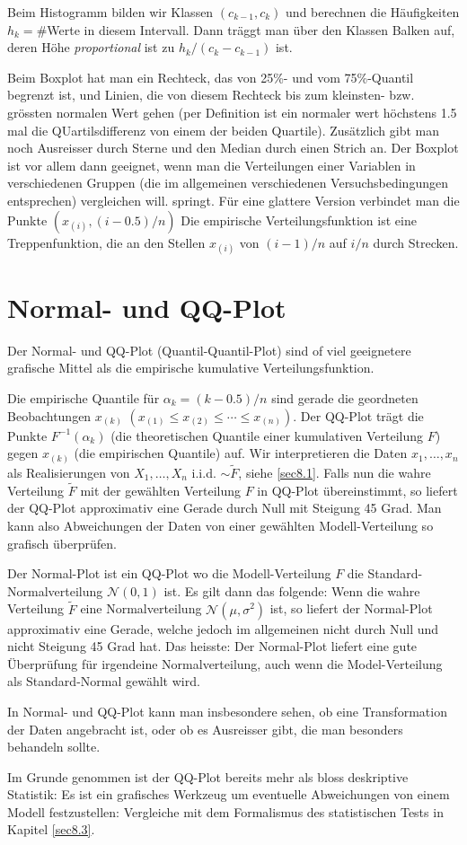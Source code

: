 Beim Histogramm bilden wir Klassen $(c_{k-1},c_k)$ und berechnen die Häufigkeiten $h_k=$\#Werte in diesem Intervall. Dann träggt man über den Klassen Balken auf, deren Höhe \emph{proportional} ist zu $h_k/(c_k-c_{k-1})$ ist.

Beim Boxplot hat man ein Rechteck, das von 25\%- und vom 75\%-Quantil begrenzt ist, und Linien, die von diesem Rechteck bis zum kleinsten- bzw. grössten \glqq normalen \grqq Wert gehen (per Definition ist ein normaler wert höchstens 1.5 mal die QUartilsdifferenz von einem der beiden Quartile). Zusätzlich gibt man noch Ausreisser durch Sterne und den Median durch einen Strich an. Der Boxplot ist vor allem dann geeignet, wenn man die Verteilungen einer Variablen in verschiedenen Gruppen (die im allgemeinen verschiedenen Versuchsbedingungen entsprechen) vergleichen will.
springt. Für eine glattere Version verbindet man die Punkte $(x_{(i)},(i-0.5)/n)$
Die empirische Verteilungsfunktion ist eine Treppenfunktion, die an den Stellen $x_{(i)}$ von $(i-1)/n$ auf $i/n$ durch Strecken.
\section{Normal- und QQ-Plot}
\label{sec7.3}
Der Normal- und QQ-Plot (\glqq Quantil-Quantil-Plot\grqq) sind of viel geeignetere grafische Mittel als die empirische kumulative Verteilungsfunktion.

Die empirische Quantile für $\alpha_k=(k-0.5)/n$ sind gerade die geordneten Beobachtungen $x_{(k)}$ $(x_{(1)}\leq x_{(2)}\leq \cdots \leq x_{(n)})$. Der QQ-Plot trägt die Punkte $F^{-1}(\alpha_k)$ (die theoretischen Quantile einer kumulativen Verteilung $F$) gegen $x_{(k)}$ (die empirischen Quantile) auf. Wir interpretieren die Daten $x_1,\ldots,x_n$ als Realisierungen von $X_1,\ldots,X_n$ i.i.d. $\sim \tilde{F}$, siehe \ref{sec8.1}. Falls nun die wahre Verteilung $\tilde{F}$ mit der gewählten Verteilung $F$ in QQ-Plot übereinstimmt, so liefert der QQ-Plot approximativ eine Gerade durch Null mit Steigung 45 Grad. Man kann also Abweichungen der Daten von einer gewählten Modell-Verteilung so grafisch überprüfen.

Der Normal-Plot ist ein QQ-Plot wo die Modell-Verteilung $F$ die Standard-Normalverteilung $\mathcal{N}(0,1)$ ist. Es gilt dann das folgende: Wenn die wahre Verteilung $\tilde{F}$ eine Normalverteilung $\mathcal{N}(\mu,\sigma^2)$ ist, so liefert der Normal-Plot approximativ eine Gerade, welche jedoch im allgemeinen nicht durch Null und nicht Steigung 45 Grad hat. Das heisste: Der Normal-Plot liefert eine gute Überprüfung für irgendeine Normalverteilung, auch wenn die Model-Verteilung als Standard-Normal gewählt wird.

In Normal- und QQ-Plot kann man insbesondere sehen, ob eine Transformation der Daten angebracht ist, oder ob es Ausreisser gibt, die man besonders behandeln sollte.

Im Grunde genommen ist der QQ-Plot bereits mehr als bloss deskriptive Statistik: Es ist ein grafisches Werkzeug um eventuelle Abweichungen von einem Modell festzustellen: Vergleiche mit dem Formalismus des statistischen Tests in Kapitel \ref{sec8.3}.
